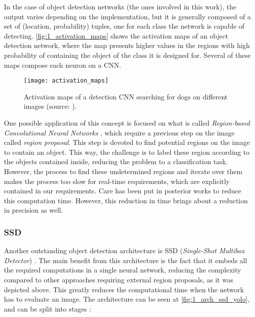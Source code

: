 In the case of object detection networks (the ones involved in this work), the output varies depending on the implementation, but it is generally composed of a set of (location, probability) tuples, one for each class the network is capable of detecting. \autoref{fig:1_activation_maps} shows the activation maps of an object detection network, where the map presents higher values in the regions with high probability of containing the object of the class it is designed for. Several of these maps compose each neuron on a CNN.

\begin{figure}[h]
	\centering
	\texttt{[image: activation\_maps]}
	\caption{Activation maps of a detection CNN searching for dogs on different images (source: \cite{tfg}).}
	\label{fig:1_activation_maps}
\end{figure}


One possible application of this concept is focused on what is called \textit{Region-based Convolutional Neural Networks} \cite{rcnn}, which require a previous step on the image called \textit{region proposal}. This step is devoted to find potential regions on the image to contain an object. This way, the challenge is to label these region according to the objects contained inside, reducing the problem to a classification task. However, the process to find these undetermined regions and iterate over them makes the process too slow for real-time requirements, which are explicitly contained in our requirements. Care has been put in posterior works \cite{fastrcnn} \cite{spp} to reduce this computation time. However, this reduction in time brings about a reduction in precision as well.\\

\subsubsection{SSD}

Another outstanding object detection architecture is SSD (\textit{Single-Shot Multibox Detector}) \cite{ssd}. The main benefit from this architecture is the fact that it embeds all the required computations in a single neural network, reducing the complexity compared to other approaches requiring external region proposals, as it was depicted above. This greatly reduces the computational time when the network has to evaluate an image. The architecture can be seen at \autoref{fig:1_arch_ssd_yolo}, and can be split into stages \cite{tfg}:

